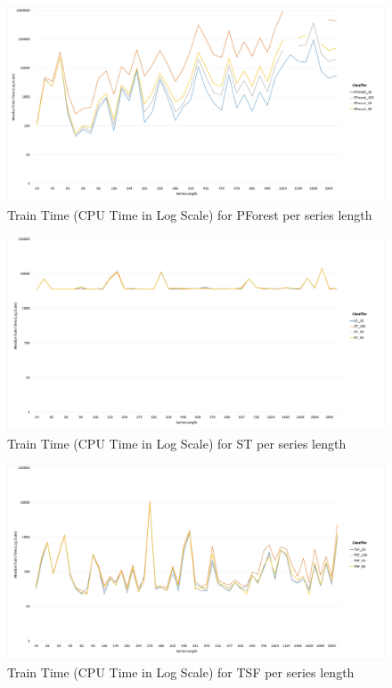   \begin{figure} [!htb]
    \centering
    \includegraphics[width=\textwidth]{./Chapters/06 Results/Duration_pforest_length.jpg}
    \caption{Train Time (CPU Time in Log Scale) for PForest per series length}
  \end{figure}
  
  \begin{figure} [!htb]
    \centering
    \includegraphics[width=\textwidth]{./Chapters/06 Results/Duration_st_length.jpg}
    \caption{Train Time (CPU Time in Log Scale) for ST per series length}
  \end{figure}
  
  \begin{figure} [!htb]
    \centering
    \includegraphics[width=\textwidth]{./Chapters/06 Results/Duration_tsf_length.jpg}
    \caption{Train Time (CPU Time in Log Scale) for TSF per series length}
  \end{figure}

